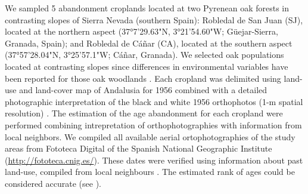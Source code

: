 \begin{table}
\caption{Main characteristics of the abandoned croplands studied.}
\centering
{}
\label{tab:coloniza:croplands}
\end{table}

We sampled 5 abandonment croplands located at two Pyrenean oak forests in contrasting slopes of Sierra Nevada (southern Spain): Robledal de San Juan (SJ), located at the northern aspect (37°7'29.63"N, 3°21'54.60"W; Güejar-Sierra, Granada, Spain); and Robledal de Cáñar (CA), located at the southern aspect (37°57'28.04"N, 3°25'57.1"W; Cáñar, Granada). We selected oak populations located at contrasting slopes since differences in environmental variables have been reported for those oak woodlands \autocite{PerezLuqueetal2021EcologicalDiversity}. Each cropland was delimited using land-use and land-cover map of Andalusia for 1956 \autocites[][]{CMA2007MapaUsos} combined with a detailed photographic interpretation of the black and white 1956 orthophotos (1-m spatial resolution) \autocites[see][for more details]{NavarroGonzalezetal2012CartografiaHistorica}. The estimation of the age abandonment for each cropland were performed combining intrepretation of orthophotographies with information from local neighbors. We compiled all available aerial ortophotographies of the study areas from Fototeca Digital of the Spanish National Geographic Institute (\href{http://fototeca.cnig.es/}{http://fototeca.cnig.es/}). These dates were verified using information about past land-use, compiled from local neighbours \autocites[by local workshops and interviews with retired elder: farmers, shepherds and loggers; see details in ][]{MorenoLlorcaetal2014CaracterizacionFuentes,MorenoLlorcaetal2016HistoricalAnalysis}. The estimated rank of ages could be considered accurate (see ).


